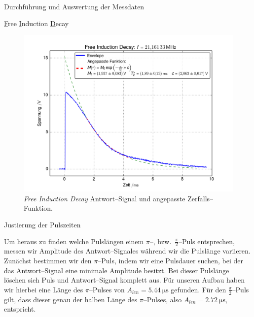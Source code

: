 \documentclass[pdftex, a4paper,11pt, twoside, ngerman]{report}
\begin{document}
\begin{chapter}{Durchführung und Auswertung der Messdaten}
\begin{section}{
        \underline{F}ree \underline{I}nduction \underline{D}ecay}
      \begin{figure}[htb]
        \centering
        \includegraphics[width=\textwidth]{Figures/FID_env2.png}
        \caption{\textit{Free Induction Decay} Antwort--Signal und angepasste
          Zerfalls--Funktion.}
        \label{figFIDenv}
      \end{figure}
      
      
      
    \end{section}
    
    
    
    \begin{section}{Justierung der Pulszeiten}
      \label{chpPulszeiten}
      
      Um heraus zu finden welche Pulslängen einem $\pi$--, bzw.\
      $\frac{\pi}{2}$--Puls entsprechen, messen wir Amplitude des
      Antwort--Signales während wir die Pulslänge variieren.
      Zunächst bestimmen wir den $\pi$--Puls, indem wir eine Pulsdauer suchen,
      bei der das Antwort--Signal eine minimale Amplitude besitzt.
      Bei dieser Pulslänge löschen sich Puls und Antwort--Signal komplett aus.
      \todo{Warum?}
      Für unseren Aufbau haben wir hierbei eine Länge des $\pi$--Pulses von
      $A_{len}=\SI{5.44}{\micro\second}$ gefunden.
      Für den $\frac{\pi}{2}$--Puls gilt, dass dieser genau der halben Länge
      des $\pi$--Pulses, also $A_{len}=\SI{2.72}{\micro\second}$, entspricht.
      

\end{section}
\end{chapter}
\end{document}
